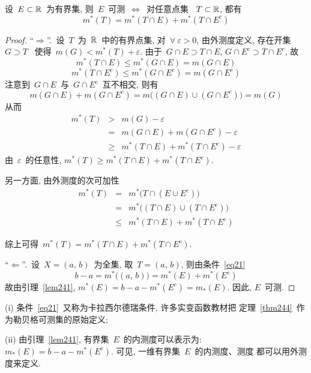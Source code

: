 \begin{theorem} \label{thm244}
设~$E \subset \mathbb{R}$~为有界集, 则~$E$~可测~$\Leftrightarrow$~对任意点集~
$T \subset \mathbb{R}$, 都有
\begin{equation} \label{eq21}
m^*(T) = m^*(T \cap E) + m^*(T \cap E^c)
\end{equation}
\end{theorem}

\begin{proof}
``$\Rightarrow$''.\ 设~$T$~为~$\mathbb{R}$~中的有界点集,
对~$\forall~\varepsilon > 0$, 由外测度定义, 存在开集~$G \supset T$~
使得~$m(G) < m^*(T) + \varepsilon$. 由于~$G \cap E \supset T \cap E,\,
G \cap E^c \supset T \cap E^c$, 故
\[
m^*(T \cap E) \leqslant m^*(G \cap E) = m(G \cap E)
\]
\[
m^*(T \cap E^c) \leqslant m^*(G \cap E^c) = m(G \cap E^c)
\]
注意到~$G \cap E$~与~$G \cap E^c$~互不相交, 则有
\[
m(G \cap E) + m(G \cap E^c) = m\big( (G \cap E) \cup (G \cap E^c) \big) = m(G)
\]
从而
\begin{eqnarray*}
m^*(T) &>& m(G) - \varepsilon \\
&=& m(G \cap E) + m(G \cap E^c) - \varepsilon \\
&\geqslant& m^*(T \cap E) + m^*(T \cap E^c) - \varepsilon
\end{eqnarray*}
由~$\varepsilon$~的任意性, $m^*(T) \geqslant m^*(T \cap E) + m^*(T \cap E^c)$.

另一方面, 由外测度的次可加性
\begin{eqnarray*}
m^*(T) &=& m^*\big( T \cap (E \cup E^c) \big) \\
&=& m^*\big( (T \cap E) \cup (T \cap E^c) \big) \\
&\leqslant& m^*(T \cap E) + m^*(T \cap E^c)
\end{eqnarray*}

综上可得~$m^*(T) = m^*(T \cap E) + m^*(T \cap E^c)$.

\smallskip

``$\Leftarrow$''.\ 设~$X = (a,\,b)$~为全集, 取~$T = (a,\,b)$, 则由条件~\eqref{eq21}
\[
b - a = m^*\big( (a,\,b) \big) = m^*(E) + m^*(E^c)
\]
故由引理~\ref{lem241}, $m^*(E) = b - a - m^*(E^c) = m_*(E)$. 因此, $E$~可测.
\end{proof}

\begin{remark}
(i) 条件~\eqref{eq21}~又称为卡拉西尔德瑞条件, 许多实变函数教材把
定理~\ref{thm244}~作为勒贝格可测集的原始定义;

(ii) 由引理~\ref{lem241}, 有界集~$E$~的内测度可以表示为:
$m_*(E) = b - a - m^*(E^c)$. 可见, 一维有界集~$E$~的内测度、测度
都可以用外测度来定义.
\end{remark}

